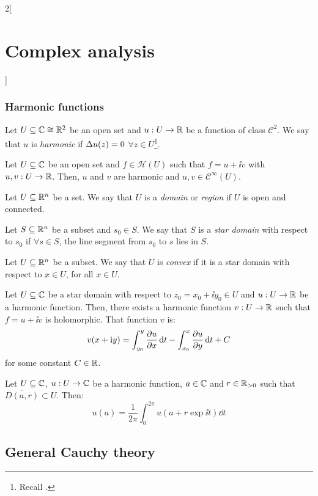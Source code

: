 \documentclass[../../../main_math.tex]{subfiles}
\begin{document}
\begin{multicols}{2}[\section{Complex analysis}]
  \subsubsection{Harmonic functions}
  \begin{definition}
    Let $U\subseteq \mathbb{C}\cong\mathbb{R}^2$ be an open set and $u:U\rightarrow \mathbb{R}$ be a function of class $\mathcal{C}^2$. We say that $u$ is \emph{harmonic} if $\Delta u(z)=0$ $\forall z\in U$\footnote{Recall .}.
  \end{definition}
  \begin{proposition}
    Let $U\subseteq \mathbb{C}$ be an open set and $f\in\mathcal{H}(U)$ such that $f=u+\ii v$ with $u,v:U\rightarrow\mathbb{R}$. Then, $u$ and $v$ are harmonic and $u,v\in\mathcal{C}^\infty(U)$.
  \end{proposition}
  \begin{definition}
    Let $U\subseteq\mathbb{R}^n$ be a set. We say that $U$ is a \emph{domain} or \emph{region} if $U$ is open and connected.
  \end{definition}
  \begin{definition}
    Let $S\subseteq\mathbb{R}^n$ be a subset and $s_0\in S$. We say that $S$ is a \emph{star domain} with respect to $s_0$ if $\forall s\in S$, the line segment from $s_0$ to $s$ lies in $S$.
  \end{definition}
  \begin{definition}
    Let $U\subseteq\mathbb{R}^n$ be a subset. We say that $U$ is \emph{convex} if it is a star domain with respect to $x\in U$, for all $x\in U$.
  \end{definition}
  \begin{proposition}
    Let $U\subseteq \mathbb{C}$ be a star domain with respect to $z_0=x_0+\ii y_0\in U$ and $u:U\rightarrow\mathbb{R}$ be a harmonic function. Then, there exists a harmonic function $v:U\rightarrow\mathbb{R}$ such that $f=u+\ii v$ is holomorphic. That function $v$ is:
    $$v(x+\mathrm{i} y)=\int_{y_0}^y\pdv{u}{x}(x+\mathrm{i} t)\dd{t}-\int_{x_0}^x\pdv{u}{y}(t+\mathrm{i} y_0)\dd{t}+C$$
    for some constant $C\in\mathbb{R}$.
  \end{proposition}
  \begin{theorem}
    Let $U\subseteq\mathbb{C}$, $u:U\rightarrow\mathbb{C}$ be a harmonic function, $a\in\mathbb{C}$ and $r\in\mathbb{R}_{>0}$ such that $\overline{D(a,r)}\subset U$. Then:
    $$u(a)=\frac{1}{2\pi}\int_0^{2\pi}u(a+r\exp{\ii t})\dd{t}$$
  \end{theorem}
  \subsection{General Cauchy theory}

\end{multicols}
\end{document}
